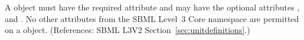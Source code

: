 A \UnitDefinition object must have the required attribute  and
may have the optional attributes ,  and
.  No other attributes from the SBML Level~3 Core namespace are
permitted on a \UnitDefinition object.  (References: SBML L3V2
Section~\ref{sec:unitdefinitions}.)
